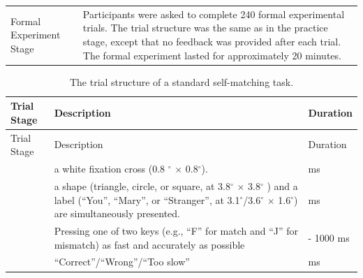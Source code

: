\documentclass[
  english,
  man,floatsintext]{apa6}
\begin{document}
\begin{longtable}[]{@{}
  >{\raggedright\arraybackslash}p{}
  >{\raggedright\arraybackslash}p{}@{}}
Formal Experiment Stage & Participants were asked to complete 240 formal experimental trials. The trial structure was the same as in the practice stage, except that no feedback was provided after each trial. The formal experiment lasted for approximately 20 minutes. \\
\end{longtable}

\begin{longtable}[]{@{}
  >{\raggedright\arraybackslash}p{}
  >{\raggedright\arraybackslash}p{}
  >{\raggedright\arraybackslash}p{}@{}}
\caption{The trial structure of a standard self-matching task.}\tabularnewline
\toprule\noalign{}
\begin{minipage}[b]{\linewidth}\raggedright
Trial Stage
\end{minipage} & \begin{minipage}[b]{\linewidth}\raggedright
Description
\end{minipage} & \begin{minipage}[b]{\linewidth}\raggedright
Duration
\end{minipage} \\
\midrule\noalign{}
\endfirsthead
\toprule\noalign{}
\begin{minipage}[b]{\linewidth}\raggedright
Trial Stage
\end{minipage} & \begin{minipage}[b]{\linewidth}\raggedright
Description
\end{minipage} & \begin{minipage}[b]{\linewidth}\raggedright
Duration
\end{minipage} \\
\midrule\noalign{}
\endhead
\bottomrule\noalign{}
\endlastfoot
& a white fixation cross (0.8 \(^\circ\) \(\times\) 0.8\(^\circ\)). & 500 ms \\
& a shape (triangle, circle, or square, at 3.8\(^\circ\) \(\times\) 3.8\(^\circ\) ) and a label (``You'', ``Mary'', or ``Stranger'', at 3.1\(^\circ\)/3.6\(^\circ\) \(\times\) 1.6\(^\circ\)) are simultaneously presented. & 100 ms \\
& Pressing one of two keys (e.g., ``F'' for match and ``J'' for mismatch) as fast and accurately as possible & 800 - 1000 ms \\
& ``Correct''/``Wrong''/``Too slow'' & 500 ms \\
\end{longtable}
\end{document}

